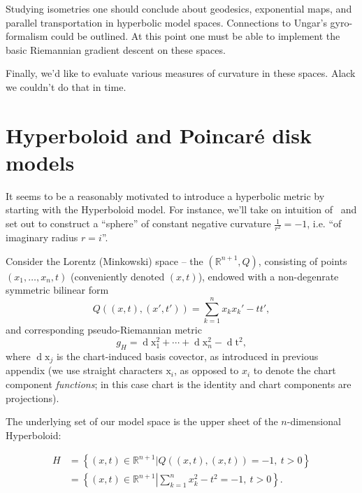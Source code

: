 Studying isometries one should conclude about geodesics, exponential maps, and
parallel transportation in hyperbolic model spaces. Connections to Ungar's
gyro-formalism could be outlined. At this point one must be able to implement
the basic Riemannian gradient descent on these spaces.

Finally, we'd like to evaluate various measures of curvature in these spaces.
Alack we couldn't do that in time.

\section{Hyperboloid and Poincar\'e disk models} \label{sec:poincareBall}

It seems to be a reasonably motivated to introduce a hyperbolic metric by
starting with the Hyperboloid model. For instance, we'll take on intuition
of~\cite{thurstonThree} and set out to construct a ``sphere'' of constant
negative curvature \( \frac{1}{r^2} = -1 \), i.e. ``of imaginary radius \( r=i
\)''.

Consider the Lorentz (Minkowski) space -- the \( (\mathbb{R}^{n+1}, Q) \),
consisting of points \( (x_1, \ldots, x_n, t) \) (conveniently denoted \( (x,
t) \)), endowed with a non-degenrate symmetric bilinear form
\[ Q((x, t), (x', t')) = \sum_{k=1}^n x_k x_k' - tt', \]
and corresponding pseudo-Riemannian metric \[ g_H = \operatorname{d}\mathrm{x}_1^2 +
\cdots + \operatorname{d}\mathrm{x}_n^2 - \operatorname{d}\mathrm{t}^2, \]
where \( \operatorname{d}\mathrm{x}_j \) is the chart-induced basis covector, as
introduced in previous appendix (we use straight characters \( \mathrm{x}_i \),
as opposed to \( x_i \) to denote the chart component \emph{functions}; in this
case chart is the identity and chart components are projections).

The underlying set of our model space is the upper sheet of the \(n\)-dimensional
Hyperboloid:

\begin{align*}
H &= \left\{ (x, t) \in \mathbb{R}^{n+1} \left| Q((x,t), (x,t)) = -1,~ t>0 \right.\right\}\\
&= \left\{ (x, t) \in \mathbb{R}^{n+1} \left| \sum_{k=1}^n x_k^2 - t^2 = -1,~t>0 \right.\right\}.
\end{align*}

